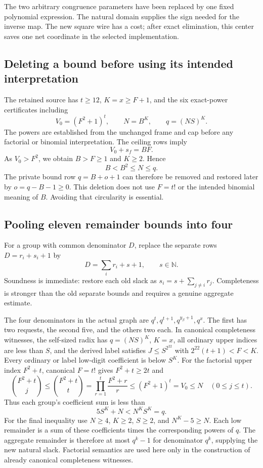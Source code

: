 \documentclass[11pt,letterpaper]{article}
\theoremstyle{remark}\newtheorem{remark}[theorem]{Remark}
\newcommand{\N}{\mathbb N}
\begin{document}
The two arbitrary congruence parameters have been replaced by one fixed
polynomial expression. The natural domain supplies the sign needed for the
inverse map. The new square wire has a cost; after exact elimination, this
center saves one net coordinate in the selected implementation.

\subsection{Deleting a bound before using its intended interpretation}

The retained source has $t\ge12$, $K=x\ge F+1$, and the six exact-power
certificates including
\[
V_0=(F^2+1)^t,\qquad N=B^K,\qquad q=(NS)^K.
\]
The powers are established from the unchanged frame and cap before any
factorial or binomial interpretation. The ceiling rows imply
\[
V_0+s_f=BF.
\]
As $V_0>F^2$, we obtain $B>F\ge1$ and $K\ge2$. Hence
\[
B<B^2\le N\le q.
\]
The private bound row $q=B+o+1$ can therefore be removed and restored later
by $o=q-B-1\ge0$. This deletion does not use $F=t!$ or the intended binomial
meaning of $B$. Avoiding that circularity is essential.

\subsection{Pooling eleven remainder bounds into four}

For a group with common denominator $D$, replace the separate rows
$D=r_i+s_i+1$ by
\[
D=\sum_i r_i+s+1,\qquad s\in\N.
\]
Soundness is immediate: restore each old slack as
$s_i=s+\sum_{j\ne i}r_j$. Completeness is stronger than the old separate
bounds and requires a genuine aggregate estimate.

The four denominators in the actual graph are
$q^t,q^{t+1},q^{y_\beta+1},q^x$. The first has two requests, the second
five, and the others two each. In canonical completeness witnesses, the
self-sized radix has $q=(NS)^K$, $K=x$, all ordinary upper indices are
less than $S$, and the derived label satisfies $J\le S^{2^{22}}$ with
$2^{22}(t+1)<F<K$. Every ordinary or label low-digit coefficient is below
$S^K$. For the factorial upper index $F^2+t$, canonical $F=t!$ gives
$F^2+t\ge2t$ and
\[
\binom{F^2+t}{j}\le\binom{F^2+t}{t}
=\prod_{r=1}^t\frac{F^2+r}{r}\le(F^2+1)^t=V_0\le N
\quad(0\le j\le t).
\]
Thus each group's coefficient sum is less than
\[
5S^K+N<N^KS^K=q.
\]
For the final inequality use $N\ge4$, $K\ge2$, $S\ge2$, and
$N^K-5\ge N$. Each low remainder is a sum of these coefficients times
the corresponding powers of $q$. The aggregate remainder is therefore
at most $q^k-1$ for denominator $q^k$, supplying the new natural slack.
Factorial semantics are used here only in the construction of already
canonical completeness witnesses.
\end{document}
